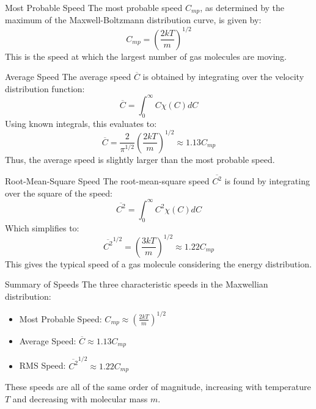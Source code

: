 \documentclass{beamer}
\begin{document}
\begin{frame}{Most Probable Speed}
    The most probable speed \( C_{mp} \), as determined by the maximum of the Maxwell-Boltzmann distribution curve, is given by:
    \[
    C_{mp} = \left( \frac{2kT}{m} \right)^{1/2}
    \]
    This is the speed at which the largest number of gas molecules are moving.
\end{frame}

\begin{frame}{Average Speed}
    The average speed \( \overline{C} \) is obtained by integrating over the velocity distribution function:
    \[
    \overline{C} = \int_0^{\infty} C \chi(C) dC
    \]
    Using known integrals, this evaluates to:
    \[
    \overline{C} = \frac{2}{\pi^{1/2}} \left( \frac{2kT}{m} \right)^{1/2} \approx 1.13 C_{mp}
    \]
    Thus, the average speed is slightly larger than the most probable speed.
\end{frame}

\begin{frame}{Root-Mean-Square Speed}
    The root-mean-square speed \( \overline{C^2} \) is found by integrating over the square of the speed:
    \[
    \overline{C^2} = \int_0^{\infty} C^2 \chi(C) dC
    \]
    Which simplifies to:
    \[
    \overline{C^2}^{1/2} = \left( \frac{3kT}{m} \right)^{1/2} \approx 1.22 C_{mp}
    \]
    This gives the typical speed of a gas molecule considering the energy distribution.
\end{frame}

\begin{frame}{Summary of Speeds}
    The three characteristic speeds in the Maxwellian distribution:
    \begin{itemize}
        \item Most Probable Speed: \( C_{mp} \approx \left( \frac{2kT}{m} \right)^{1/2} \)
        \item Average Speed: \( \overline{C} \approx 1.13 C_{mp} \)
        \item RMS Speed: \( \overline{C^2}^{1/2} \approx 1.22 C_{mp} \)
    \end{itemize}
    
    These speeds are all of the same order of magnitude, increasing with temperature \( T \) and decreasing with molecular mass \( m \).
\end{frame}
\end{document}
